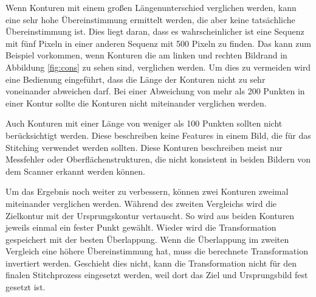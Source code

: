 Wenn Konturen mit einem großen Längenunterschied verglichen werden, 
kann eine sehr hohe Übereinstimmung ermittelt werden, die aber keine 
tatsächliche Übereinstimmung ist. Dies liegt daran, dass es wahrscheinlicher ist 
eine Sequenz mit fünf Pixeln in einer anderen Sequenz mit 500 Pixeln zu finden.  
Das kann zum Beispiel vorkommen, wenn Konturen 
die am linken und rechten Bildrand in Abbildung \ref{fig:cons} zu sehen sind, 
verglichen werden. Um dies zu vermeiden wird eine Bedienung eingeführt, dass die Länge
der Konturen nicht zu sehr voneinander abweichen darf. Bei einer Abweichung von mehr als
200 Punkten in einer Kontur sollte die Konturen nicht miteinander verglichen werden.

Auch Konturen mit einer Länge von weniger als 100 Punkten sollten nicht berücksichtigt 
werden. Diese beschreiben keine Features in einem Bild, die für das Stitching verwendet 
werden sollten. Diese Konturen beschreiben meist nur Messfehler oder 
Oberflächenstrukturen, die nicht konsistent in beiden Bildern von dem Scanner erkannt 
werden können.

Um das Ergebnis noch weiter zu verbessern, können zwei Konturen zweimal miteinander 
verglichen werden. Während des zweiten Vergleichs wird die Zielkontur mit der 
Ursprungskontur vertauscht. So wird aus beiden Konturen jeweils einmal ein fester 
Punkt gewählt. Wieder wird die Transformation gespeichert mit der besten Überlappung.
Wenn die Überlappung im zweiten Vergleich eine höhere Übereinstimmung hat, muss die 
berechnete Transformation invertiert werden. Geschieht dies nicht, kann die 
Transformation nicht für den finalen Stitchprozess eingesetzt werden, weil dort 
das Ziel und Ursprungsbild fest gesetzt ist.
